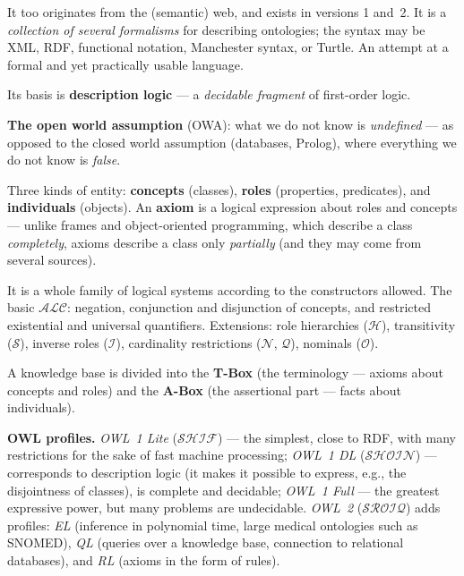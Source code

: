 \documentclass[11pt,a4paper]{article}
\theoremstyle{definition}
\begin{document}
\begin{defbox}
It too originates from the (semantic) web, and exists in versions 1 and~2. It is a \emph{collection of
several formalisms} for describing ontologies; the syntax may be XML, RDF, functional notation,
Manchester syntax, or Turtle. An attempt at a formal and yet practically usable language.

Its basis is \textbf{description logic} --- a \emph{decidable fragment} of first-order logic.

\textbf{The open world assumption} (OWA): what we do not know is \emph{undefined} --- as opposed to
the closed world assumption (databases, Prolog), where everything we do not know is \emph{false}.
\end{defbox}

\begin{defbox}
Three kinds of entity: \textbf{concepts} (classes), \textbf{roles} (properties, predicates), and
\textbf{individuals} (objects). An \textbf{axiom} is a logical expression about roles and concepts
--- unlike frames and object-oriented programming, which describe a class \emph{completely}, axioms
describe a class only \emph{partially} (and they may come from several sources).

It is a whole family of logical systems according to the constructors allowed. The basic
$\mathcal{ALC}$: negation, conjunction and disjunction of concepts, and restricted existential and
universal quantifiers. Extensions: role hierarchies ($\mathcal{H}$), transitivity
($\mathcal{S}$), inverse roles ($\mathcal{I}$), cardinality restrictions ($\mathcal{N}$,
$\mathcal{Q}$), nominals ($\mathcal{O}$).

A knowledge base is divided into the \textbf{T-Box} (the terminology --- axioms about concepts and
roles) and the \textbf{A-Box} (the assertional part --- facts about individuals).
\end{defbox}

\textbf{OWL profiles.} \emph{OWL~1 Lite} ($\mathcal{SHIF}$) --- the simplest, close to RDF, with many
restrictions for the sake of fast machine processing; \emph{OWL~1 DL} ($\mathcal{SHOIN}$) ---
corresponds to description logic (it makes it possible to express, e.g., the disjointness of classes),
is complete and decidable; \emph{OWL~1 Full} --- the greatest expressive power, but many problems are
undecidable. \emph{OWL~2} ($\mathcal{SROIQ}$) adds profiles: \emph{EL} (inference in polynomial time,
large medical ontologies such as SNOMED), \emph{QL} (queries over a knowledge base, connection to
relational databases), and \emph{RL} (axioms in the form of rules).
\end{document}
